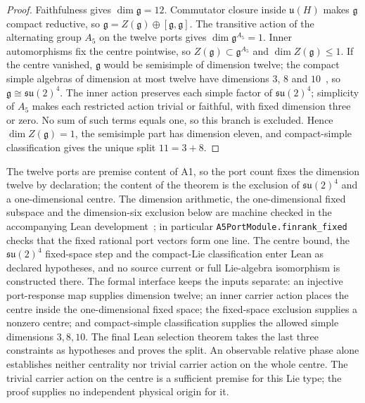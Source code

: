 \documentclass[11pt]{article}
\begin{document}
\begin{proof}
Faithfulness gives \(\dim\mathfrak g=12\). Commutator closure inside
\(\mathfrak u(H)\) makes \(\mathfrak g\) compact reductive, so
\(\mathfrak g=Z(\mathfrak g)\oplus[\mathfrak g,\mathfrak g]\). The
transitive action of the alternating group \(A_5\) on the twelve ports gives
\(\dim\mathfrak g^{A_5}=1\). Inner automorphisms fix the centre pointwise,
so \(Z(\mathfrak g)\subset\mathfrak g^{A_5}\) and
\(\dim Z(\mathfrak g)\le1\). If the centre vanished, \(\mathfrak g\) would be
semisimple of dimension twelve; the compact simple algebras of dimension at
most twelve have dimensions \(3\), \(8\) and \(10\)~\cite{knapp2002}, so
\(\mathfrak g\cong\mathfrak{su}(2)^4\). The inner action preserves each
simple factor of \(\mathfrak{su}(2)^4\); simplicity of \(A_5\) makes each
restricted action trivial or faithful, with fixed dimension three or zero.
No sum of such terms equals one, so this branch is excluded. Hence
\(\dim Z(\mathfrak g)=1\), the semisimple part has dimension eleven, and
compact-simple classification gives the unique split \(11=3+8\).
\end{proof}

The twelve ports are premise content of A1, so the port count fixes the
dimension twelve by declaration; the content of the
theorem is the exclusion of \(\mathfrak{su}(2)^4\) and a one-dimensional
centre. The dimension arithmetic, the one-dimensional fixed subspace and the
dimension-six exclusion below are machine checked in the accompanying Lean
development~\cite{ophrepo}; in particular \texttt{A5PortModule.finrank\_fixed}
checks that the fixed rational port vectors form one line. The centre bound, the \(\mathfrak{su}(2)^{4}\)
fixed-space step and the compact-Lie classification enter Lean as declared hypotheses, and no
source current or full Lie-algebra isomorphism is constructed there. The
formal interface keeps the inputs separate: an injective port-response map
supplies dimension twelve; an inner carrier action places the centre inside
the one-dimensional fixed space; the fixed-space exclusion supplies a nonzero
centre; and compact-simple classification supplies the allowed simple
dimensions \(3,8,10\). The final Lean selection theorem takes the last three
constraints as hypotheses and proves the split. An observable relative phase
alone establishes neither centrality nor trivial carrier action on the whole
centre. The trivial carrier action on the centre is a sufficient premise for
this Lie type; the proof supplies no independent physical origin for it.
\end{document}
